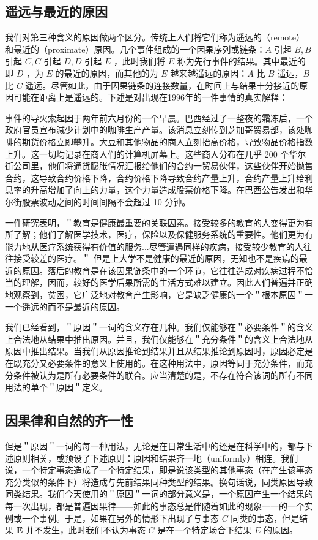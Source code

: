 \subsection{遥远与最近的原因}

我们对第三种含义的原因做两个区分。传统上人们将它们称为遥远的（remote）和最近的（proximate）原因。几个事件组成的一个因果序列或链条：$A$ 引起 $B, B$ 引起 $C, C$ 引起 $D, D$ 引起 $E$ ，此时我们将 $E$ 称为先行事件的结果。其中最近的即 $D$ ，为 $E$ 的最近的原因，而其他的为 $E$ 越来越遥远的原因：$A$ 比 $B$ 遥远，$B$ 比 $C$ 遥远。尽管如此，由于因果链条的连接数量，在时间上与结果十分接近的原因可能在距离上是遥远的。下述是对出现在1996年的一件事情的真实解释：

事件的导火索起因于两年前六月份的一个早晨。巴西经过了一整夜的霜冻后，一个政府官员宣布減少计划中的咖啡生产产量。该消息立刻传到芝加哥贸易部，该处咖啡的期货价格立即攀升。大豆和其他物品的商人立刻抬高价格，导致物品价格指数上升。这一切均记录在商人们的计算机屏幕上。这些商人分布在几乎 200 个华尔街公司里，他们将通货膨胀情况汇报给他们的合约一贸易伙伴，这些伙伴开始抛售合约，这导致合约价格下降，合约价格下降导致合约产量上升，合约产量上升给利息率的升高增加了向上的力量，这个力量造成股票价格下降。在巴西公告发出和华尔街股票波动之间的时间间隔不会超过 10 分钟。\cite{nasar1996}

一件研究表明，＂教育是健康最重要的关联因素。接受较多的教育的人变得更为有所了解；他们了解医学技术，医疗，保险以及保健服务系统的重要性。他们更为有能力地从医疗系统获得有价值的服务...尽管遭遇同样的疾病，接受较少教育的人往往接受较差的医疗。＂\cite{kitagawa1973} 但是上大学不是健康的最近的原因，无知也不是疾病的最近的原因。落后的教育是在该因果链条中的一个环节，它往往造成对疾病过程不恰当的理解，因而，较好的医学后果所需的生活方式难以建立。因此人们普遍并正确地观察到，贫困，它广泛地对教育产生影响，它是缺乏健康的一个＂根本原因＂一一个遥远的而不是最近的原因。

我们已经看到，＂原因＂一词的含义存在几种。我们仅能够在＂必要条件＂的含义上合法地从结果中推出原因。并且，我们仅能够在＂充分条件＂的含义上合法地从原因中推出结果。当我们从原因推论到结果并且从结果推论到原因时，原因必定是在既充分又必要条件的意义上使用的。在这种用法中，原因等同于充分条件，而充分条件被认为是所有必要条件的联合。应当清楚的是，不存在符合该词的所有不同用法的单个＂原因＂定义。

\subsection{因果律和自然的齐一性}

但是＂原因＂一词的每一种用法，无论是在日常生活中的还是在科学中的，都与下述原则相关，或预设了下述原则：原因和结果齐一地（uniformly）相连。我们说，一个特定事态造成了一个特定结果，即是说该类型的其他事态（在产生该事态充分类似的条件下）将造成与先前结果同种类型的结果。换句话说，同类原因导致同类结果。我们今天使用的＂原因＂一词的部分意义是，一个原因产生一个结果的每一次出现，都是普遍因果律——如此的事态总是伴随着如此的现象一一的一个实例或一个事例。于是，如果在另外的情形下出现了与事态 $C$ 同类的事态，但是结果 $\boldsymbol{E}$ 并不发生，此时我们不认为事态 $C$ 是在一个特定场合下结果 $E$ 的原因。

